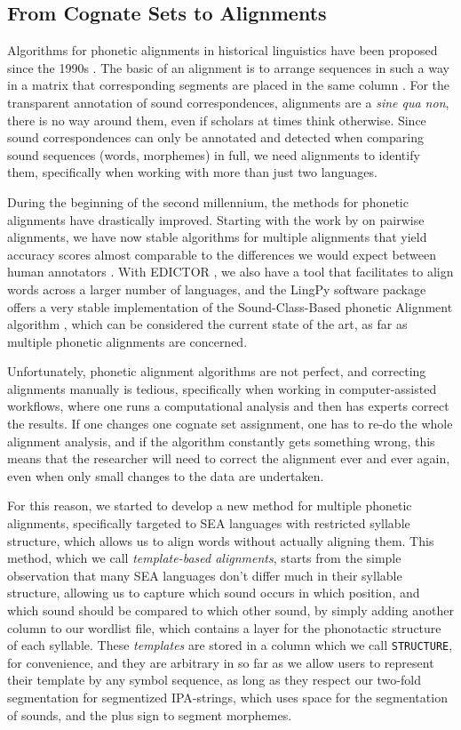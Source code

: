 \documentclass[xetex,svgnames]{scrartcl}
\begin{document}
\subsection{From Cognate Sets to Alignments}
Algorithms for phonetic alignments in historical linguistics have been proposed since the 1990s
\citep{Covington1996,Covington1998}. The basic of an alignment is to arrange sequences in such a way
in a matrix
that corresponding segments are placed in the same column \citep{List2018d}. For the transparent
annotation of sound correspondences, alignments are a \emph{sine qua non}, there is no way around
them, even if scholars at times think otherwise. Since sound correspondences can only be annotated
and detected when comparing sound sequences (words, morphemes) in full, we need alignments to
identify them, specifically when working with more than just two languages.

During the beginning of the second millennium, the methods for phonetic alignments have drastically
improved. Starting with the work by \citet{Kondrak2000} on pairwise alignments, we have now stable
algorithms for multiple alignments that yield accuracy scores almost comparable to the
differences we would expect between human annotators \citep{List2014d}. With EDICTOR
\citep{List2017d}, we also have a
tool that facilitates to align words across a larger number of languages, and the LingPy software
package \citep{List2018i} offers a very stable implementation of the Sound-Class-Based phonetic
Alignment algorithm \citep{List2012c}, which can be considered the current state of the art, as far
as multiple phonetic alignments are concerned.

Unfortunately, phonetic alignment algorithms are not perfect, and correcting alignments manually is
tedious, specifically when working in computer-assisted workflows, where one runs a computational
analysis and then has experts correct the results. If one changes one cognate set assignment, one
has to re-do the whole alignment analysis, and if the algorithm constantly gets something wrong,
this means that the researcher will need to correct the alignment ever and ever again, even when
only small changes to the data are undertaken.

For this reason, we started to develop a new method for multiple phonetic alignments, specifically
targeted to SEA languages with restricted syllable structure, which allows us to align words without
actually aligning them. This method, which we call \emph{template-based alignments}, starts from the
simple observation that many SEA languages don't differ much in their syllable structure, allowing
us to capture which sound occurs in which position, and which sound should be compared to which
other sound, by simply adding another column to our wordlist file, which contains a layer for the
phonotactic structure of each syllable. These \emph{templates} are stored in a column which we call
\texttt{STRUCTURE}, for convenience, and they are arbitrary in so far as we allow users to represent
their template by any symbol sequence, as long as they respect our two-fold segmentation for
segmentized IPA-strings, which uses space for the segmentation of sounds, and the plus sign to
segment morphemes.
\end{document}
